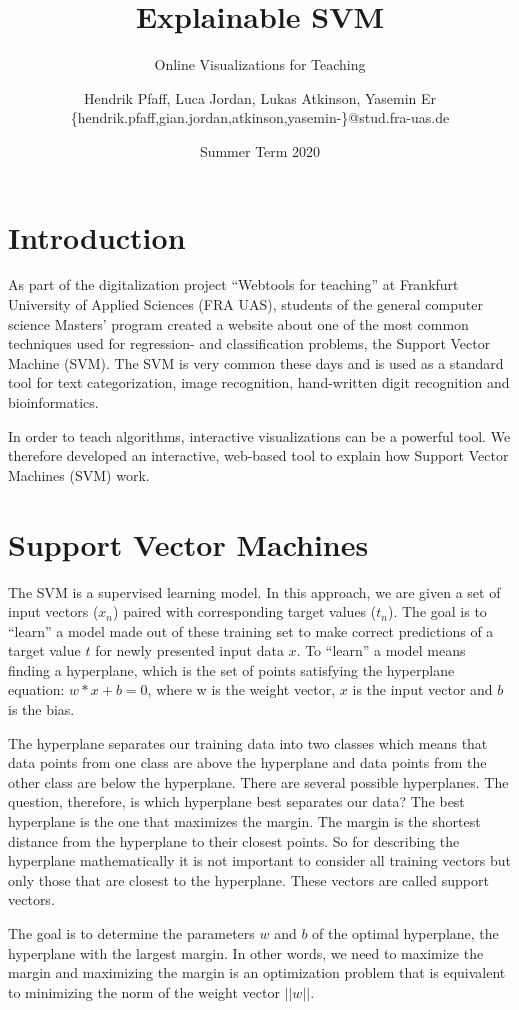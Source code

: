 \documentclass{scrartcl}
\title{Explainable SVM}
\subtitle{Online Visualizations for Teaching}
\author{
  Hendrik Pfaff, Luca Jordan, Lukas Atkinson, Yasemin Er
  \\
  {\normalsize\ttfamily \{hendrik.pfaff,gian.jordan,atkinson,yasemin-\}@stud.fra-uas.de}
}
\date{Summer Term 2020}
\begin{document}
\maketitle

\section{Introduction}
As part of the digitalization project “Webtools for teaching” at Frankfurt University of Applied Sciences (FRA UAS), students of the general computer science Masters’ program created a website about one of the most common techniques used for regression- and classification problems, the Support Vector Machine (SVM). 
The SVM is very common these days and is used as a standard tool for text categorization, image recognition, hand-written digit recognition and bioinformatics.

In order to teach algorithms, interactive visualizations can be a powerful tool.
We therefore developed an interactive, web-based tool
to explain how Support Vector Machines (SVM) work.

\section{Support Vector Machines}
The SVM is a supervised learning model. In this approach, we are given a set of input vectors ($x_n$) paired with corresponding target values ($t_n$). 
The goal is to “learn” a model made out of these training set to make correct predictions of a target value $t$ for newly presented input data $x$. 
To “learn” a model means finding a hyperplane,
which is the set of points satisfying the hyperplane equation: $w*x+b = 0$,
where w is the weight vector, $x$ is the input vector and $b$ is the bias.

The hyperplane separates our training data into two classes which means that data points from one class are above the hyperplane and data points from the other class are below the hyperplane. 
There are several possible hyperplanes. The question, therefore, is which hyperplane best separates our data? The best hyperplane is the one that maximizes the margin. The margin is the shortest distance from the hyperplane to their closest points. 
So for describing the hyperplane mathematically it is not important to consider all training vectors but only those that are closest to the hyperplane. These vectors are called support vectors. 

The goal is to determine the parameters $w$ and $b$ of the optimal hyperplane, the hyperplane with the largest margin. In other words, we need to maximize the margin and maximizing the margin is an optimization problem that is equivalent to minimizing the norm of the weight vector $||w||$. 
\end{document}
